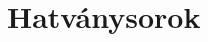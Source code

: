 \documentclass[tikz,12pt,margin=0px]{article}
\makeatletter
\renewcommand\paragraph{%
	\@startsection{paragraph}{4}{0mm}%
	{-\baselineskip}%
	{.5\baselineskip}%
	{\normalfont\normalsize\bfseries}}
\makeatother
\begin{document}
	






    \section*{Hatványsorok}
\end{document}
